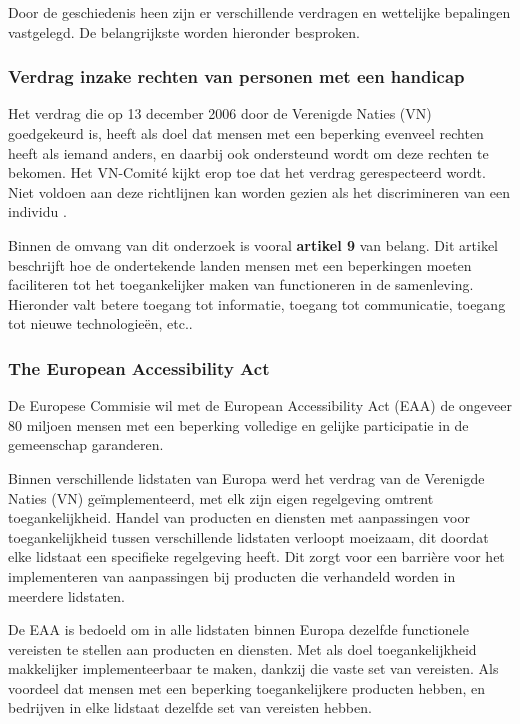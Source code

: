 Door de geschiedenis heen zijn er verschillende verdragen en wettelijke bepalingen vastgelegd. De belangrijkste worden hieronder besproken. 




\subsubsection{Verdrag inzake rechten van personen met een handicap}
\label{vn-Verdrag}
Het verdrag die op 13 december 2006 door de Verenigde Naties (VN) goedgekeurd is, heeft als doel dat mensen met een beperking evenveel rechten heeft als iemand anders, en daarbij ook ondersteund wordt om deze rechten te bekomen.  Het VN-Comité kijkt erop toe dat het verdrag gerespecteerd wordt. Niet voldoen aan deze richtlijnen kan worden gezien als het discrimineren van een individu \autocite{unia2006}. 

Binnen de omvang van dit onderzoek is vooral  \textbf{artikel 9} van belang. Dit artikel beschrijft hoe de ondertekende landen mensen met een beperkingen moeten faciliteren tot het toegankelijker maken van functioneren in de samenleving. Hieronder valt betere toegang tot informatie, toegang tot communicatie, toegang tot nieuwe technologieën, etc.. \autocite{un2006}

\subsubsection{The European Accessibility Act}
De Europese Commisie wil met de European Accessibility Act (EAA) de ongeveer 80 miljoen mensen met een beperking volledige en gelijke participatie in de gemeenschap garanderen. 

Binnen verschillende lidstaten van Europa werd het verdrag van de Verenigde Naties (VN) geïmplementeerd, met elk zijn eigen regelgeving omtrent toegankelijkheid.
Handel van producten en diensten met aanpassingen voor toegankelijkheid tussen verschillende lidstaten verloopt moeizaam, dit doordat elke lidstaat een specifieke regelgeving heeft.
Dit zorgt voor een barrière voor het implementeren van aanpassingen bij producten die verhandeld worden in meerdere lidstaten.

De EAA is bedoeld om in alle lidstaten binnen Europa dezelfde functionele vereisten te stellen aan producten en diensten. Met als doel toegankelijkheid makkelijker implementeerbaar te maken, dankzij die vaste set van vereisten. 
Als voordeel dat mensen met een beperking toegankelijkere producten hebben, en bedrijven in elke lidstaat dezelfde set van vereisten hebben.

